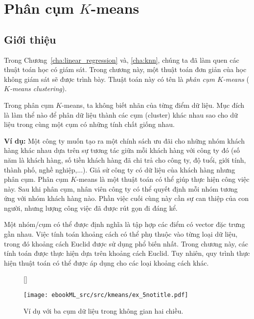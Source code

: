 \chapter{Phân cụm $K$-means}
\label{cha:kmeans}
\section{Giới thiệu}
Trong Chương~\ref{cha:linear_regression} và, \ref{cha:knn}, chúng ta đã làm quen
các thuật toán học có giám sát. Trong chương này, một thuật toán đơn giản của
học không giám sát sẽ được trình bày. Thuật toán này có tên là \textit{phân cụm
$K$-means} (\textit{$K$-means clustering}).

Trong phân cụm $K$-means, ta không biết nhãn của từng
điểm dữ liệu. Mục đích là làm thể nào để phân dữ liệu thành các cụm (cluster)
khác nhau sao cho dữ liệu trong cùng một cụm có những tính chất giống nhau.

\textbf{Ví dụ:} Một công ty muốn tạo ra một chính sách ưu đãi cho những nhóm
khách hàng khác nhau dựa trên sự tương tác giữa mỗi khách hàng với công ty đó
(số năm là khách hàng, số tiền khách hàng đã chi trả cho công ty, độ tuổi, giới
tính, thành phố, nghề nghiệp,...). Giả sử công ty có dữ liệu của khách hàng
nhưng phân cụm. Phân cụm $K$-means là một thuật toán có thể giúp thực hiện
công việc này. Sau khi phân cụm, nhân viên công ty có thể quyết định mỗi
nhóm tương ứng với nhóm khách hàng nào. Phần việc cuối cùng này cần sự can thiệp
của con người, nhưng lượng công việc đã được rút gọn đi đáng kể.


Một nhóm/cụm có thể được định nghĩa là tập hợp các điểm có
vector đặc trưng gần nhau. Việc tính toán khoảng cách có thể phụ thuộc vào từng loại dữ liệu, trong đó khoảng cách Euclid được sử dụng phổ biến nhất. Trong chương này, các tính toán được thực hiện dựa trên khoảng cách Euclid. Tuy nhiên, quy trình thực hiện thuật toán có thể được áp dụng cho các loại khoảng cách khác. 

\begin{figure}[t]
    [\FBwidth]
    {\caption{ 
    Ví dụ với ba cụm dữ liệu trong không gian hai chiều. 
    }
    \label{fig:4_1}}
    { %
    \texttt{[image: ebookML\_src/src/kmeans/ex\_5notitle.pdf]}
    }
\end{figure}

